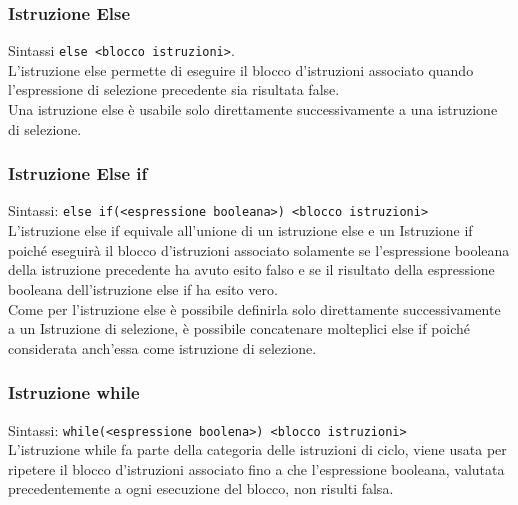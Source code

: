 \subsubsection{Istruzione Else}
Sintassi \verb|else <blocco istruzioni>|. \\
L'istruzione else permette di eseguire il blocco d'istruzioni associato quando l'espressione
di selezione precedente sia risultata false. \\
Una istruzione else è usabile solo direttamente successivamente a una istruzione di selezione.

\subsubsection{Istruzione Else if}
Sintassi: \verb|else if(<espressione booleana>) <blocco istruzioni>| \\
L'istruzione else if equivale all'unione di un istruzione else e un Istruzione if poiché 
eseguirà il blocco d'istruzioni associato solamente se l'espressione booleana della 
istruzione precedente ha avuto esito falso e se il risultato della espressione booleana 
dell'istruzione else if ha esito vero. \\
Come per l'istruzione else è possibile definirla solo direttamente successivamente a un Istruzione 
di selezione, è possibile concatenare molteplici else if poiché considerata anch'essa come 
istruzione di selezione.

\subsubsection{Istruzione while}
Sintassi: \verb|while(<espressione boolena>) <blocco istruzioni>| \\
L'istruzione while fa parte della categoria delle istruzioni di ciclo, viene usata per ripetere
il blocco d'istruzioni associato fino a che l'espressione booleana, valutata precedentemente a ogni 
esecuzione del blocco, non risulti falsa.

